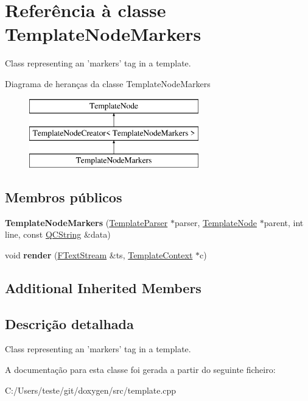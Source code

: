 \hypertarget{class_template_node_markers}{\section{Referência à classe Template\-Node\-Markers}
\label{class_template_node_markers}
}


Class representing an 'markers' tag in a template.  


Diagrama de heranças da classe Template\-Node\-Markers\begin{figure}[H]
\begin{center}
\leavevmode
\includegraphics[height=3.000000cm]{class_template_node_markers}
\end{center}
\end{figure}
\subsection*{Membros públicos}
\begin{DoxyCompactItemize}
\item 
\hypertarget{class_template_node_markers_acb0ce7d1d82df5ceddeb1c237b3c05ca}{{\bfseries Template\-Node\-Markers} (\hyperlink{class_template_parser}{Template\-Parser} $\ast$parser, \hyperlink{class_template_node}{Template\-Node} $\ast$parent, int line, const \hyperlink{class_q_c_string}{Q\-C\-String} \&data)}\label{class_template_node_markers_acb0ce7d1d82df5ceddeb1c237b3c05ca}

\item 
\hypertarget{class_template_node_markers_aaa6575d8c79eeaa49f849f1ca1d6b228}{void {\bfseries render} (\hyperlink{class_f_text_stream}{F\-Text\-Stream} \&ts, \hyperlink{class_template_context}{Template\-Context} $\ast$c)}\label{class_template_node_markers_aaa6575d8c79eeaa49f849f1ca1d6b228}

\end{DoxyCompactItemize}
\subsection*{Additional Inherited Members}


\subsection{Descrição detalhada}
Class representing an 'markers' tag in a template. 

A documentação para esta classe foi gerada a partir do seguinte ficheiro\-:\begin{DoxyCompactItemize}
\item 
C\-:/\-Users/teste/git/doxygen/src/template.\-cpp\end{DoxyCompactItemize}
